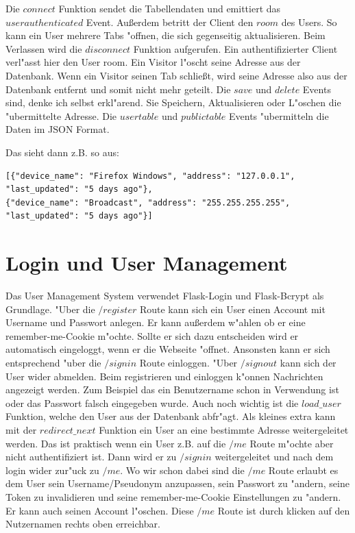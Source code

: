 Die $connect$ Funktion sendet die Tabellendaten und emittiert das $user authenticated$ Event.
Au\ss erdem betritt der Client den $room$ des Users.
So kann ein User mehrere Tabs {"o}ffnen, die sich gegenseitig aktualisieren.
Beim Verlassen wird die $disconnect$ Funktion aufgerufen.
Ein authentifizierter Client verl{"a}sst hier den User room.
Ein Visitor l{"o}scht seine Adresse aus der Datenbank.
Wenn ein Visitor seinen Tab schlie\ss t, wird seine Adresse also aus der Datenbank entfernt und somit nicht mehr geteilt.
Die $save$ und $delete$ Events sind, denke ich selbst erkl{"a}rend.
Sie Speichern, Aktualisieren oder L{"o}schen die {"u}bermittelte Adresse.
Die $user table$ und $public table$ Events {"u}bermitteln die Daten im JSON Format.
\begin{samepage}
    Das sieht dann z.B. so aus:
    \begin{lstlisting}
[{"device_name": "Firefox Windows", "address": "127.0.0.1", "last_updated": "5 days ago"},
{"device_name": "Broadcast", "address": "255.255.255.255", "last_updated": "5 days ago"}]
    \end{lstlisting}
\end{samepage}


\section{Login und User Management}\label{sec:login_views}
Das User Management System verwendet Flask-Login und Flask-Bcrypt als Grundlage.
{"U}ber die $/register$ Route kann sich ein User einen Account mit Username und Passwort anlegen.
Er kann au\ss erdem w{"a}hlen ob er eine remember-me-Cookie m{"o}chte.
Sollte er sich dazu entscheiden wird er automatisch eingeloggt, wenn er die Webseite {"o}ffnet.
Ansonsten kann er sich entsprechend {"u}ber die $/signin$ Route einloggen.
{"U}ber $/signout$ kann sich der User wider abmelden.
Beim registrieren und einloggen k{"o}nnen Nachrichten angezeigt werden.
Zum Beispiel das ein Benutzername schon in Verwendung ist oder das Passwort falsch eingegeben wurde.
Auch noch wichtig ist die $load\_user$ Funktion, welche den User aus der Datenbank abfr{"a}gt.
Als kleines extra kann mit der $redirect\_next$ Funktion ein User an eine bestimmte Adresse weitergeleitet werden.
Das ist praktisch wenn ein User z.B. auf die $/me$ Route m{"o}chte aber nicht authentifiziert ist.
Dann wird er zu $/signin$ weitergeleitet und nach dem login wider zur{"u}ck zu $/me$.
Wo wir schon dabei sind die $/me$ Route erlaubt es dem User sein Username/Pseudonym anzupassen,
sein Passwort zu {"a}ndern, seine Token zu invalidieren und seine remember-me-Cookie Einstellungen zu {"a}ndern.
Er kann auch seinen Account l{"o}schen.
Diese $/me$ Route ist durch klicken auf den Nutzernamen rechts oben erreichbar.

